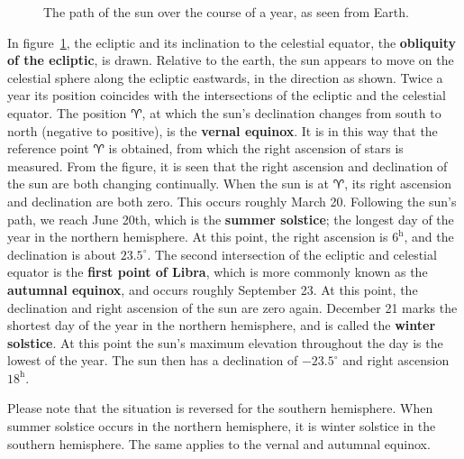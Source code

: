 \begin{figure}[htpb]
	\centering
	
	\caption{The path of the sun over the course of a year, as seen from Earth.}
	\label{fig:cel-sph-ecl}
\end{figure}
%
In figure~\ref{fig:cel-sph-ecl}, the ecliptic and its inclination to the celestial
equator, the \textbf{obliquity of the ecliptic}, is drawn. Relative to the earth, the sun
appears to move on the celestial sphere along the ecliptic eastwards, in the direction as
shown. Twice a year its position coincides with the intersections of the ecliptic and the
celestial equator. The position $\aries$, at which the sun's declination changes from
south to north (negative to positive), is the \textbf{vernal equinox}. It is in this way
that the reference point $\aries$ is obtained, from which the right ascension of stars is
measured. From the figure, it is seen that the right ascension and declination of the sun
are both changing continually. When the sun is at $\aries$, its right ascension and
declination are both zero. This occurs roughly March 20. Following the sun's path, we
reach June 20th, which is the \textbf{summer solstice}; the longest day of the year
in the northern hemisphere. At this point, the right ascension is $6^{\mathrm{h}}$, and
the declination is about $23.5^\circ$. The second intersection of the ecliptic and
celestial equator is the \textbf{first point of Libra}, which is more commonly known as the
\textbf{autumnal equinox}, and occurs roughly September 23. At this point, the declination
and right ascension of the sun are zero again. December 21 marks the shortest day of the
year in the northern hemisphere, and is called the \textbf{winter solstice}. At this
point the sun's maximum elevation throughout the day is the lowest of the year. The sun
then has a declination of $-23.5^\circ$ and right ascension
$18^{\mathrm{h}}$.

Please note that the situation is reversed for the southern hemisphere. When summer
solstice occurs in the northern hemisphere, it is winter solstice in the southern
hemisphere. The same applies to the vernal and autumnal equinox.

